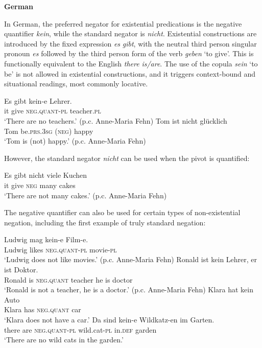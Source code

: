 \documentclass[output=paper]{langsci/langscibook}
\begin{document}
\begin{unindented}
\textbf{German}

In German, the preferred negator for existential predications is the negative quantifier \textit{kein}, while the standard negator is \textit{nicht}. Existential constructions are introduced by the fixed expression \textit{es} \textit{gibt}, with the neutral third person singular pronoun \textit{es} followed by the third person form of the verb \textit{geben} `to give'. This is functionally equivalent to the English \textit{there} \textit{is/are}. The use of the copula \textit{sein} `to be' is not allowed in existential constructions, and it triggers context-bound and situational readings, most commonly locative. 
%
\begin{exe}\ex \gll Es gibt  kein-e Lehrer.  \\
it   give \textsc{neg.quant-pl} teacher.\textsc{pl} \\
    \glt `There are no teachers.' (p.c. Anne-Maria Fehn)
\ex \gll Tom ist {\op}nicht{\cp} glücklich \\
Tom be.\textsc{prs.3sg} (\textsc{neg}) happy \\
    \glt `Tom is (not) happy.' (p.c. Anne-Maria Fehn)
    \end{exe}

However, the standard negator \textit{nicht} can be used when the pivot is quantified:
%
\begin{exe}\ex \gll Es gibt nicht viele   Kuchen \\
it   give \textsc{neg}  many cakes \\
    \glt `There are not many cakes.' (p.c. Anne-Maria Fehn)
    \end{exe}

The negative quantifier can also be used for certain types of non-existential negation, including the first example of truly standard negation:
%
\begin{exe}\ex \gll Ludwig mag kein-e Film-e.  \\
Ludwig likes \textsc{neg.quant-pl} movie-\textsc{pl} \\
    \glt `Ludwig does not like movies.' (p.c. Anne-Maria Fehn)
\ex \gll Ronald ist kein Lehrer, er ist Doktor.  \\
Ronald is  \textsc{neg.quant} teacher he is doctor \\
    \glt `Ronald is not a teacher, he is a doctor.' (p.c. Anne-Maria Fehn)
\ex \gll Klara hat kein Auto \\
Klara has \textsc{neg.quant} car \\
    \glt `Klara does not have a car.'
\ex \gll Da sind kein-e Wildkatz-en im Garten.  \\
there are \textsc{neg.quant-pl} wild.cat-\textsc{pl} in.\textsc{def} garden \\
    \glt `There are no wild cats in the garden.'
    \end{exe}


\end{unindented}
\end{document}
